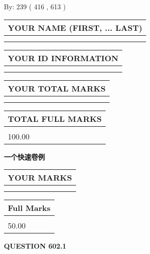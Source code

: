 \documentclass{ctexart}
\begin{document}
   
\hspace{1.0in} By: 
 239 ( 416 ,  613 )
   
   
   
   
\newpage 
\setcounter{page}{ 
   602001 } 
   
   
   
   
\noindent\begin{tabular}{|l|}
\hline
YOUR NAME (FIRST, ... LAST)  \\
\hline
 \\ 
 \\ 
\hline
\end{tabular}
\hspace{0.05in} \begin{tabular}{|l|}
\hline
 YOUR   ID   INFORMATION  \\
\hline
 \\ 
 \\ 
\hline
\end{tabular}
   
   
\vspace{0.2in}\noindent\begin{tabular}{|l|}
\hline
YOUR TOTAL MARKS  \\
\hline
 \\ 
 \\ 
\hline
\end{tabular}
\hspace{0.05in} \begin{tabular}{|l|}
\hline
TOTAL FULL MARKS  \\
\hline
 \\ 
100.00 \\
\hline
\end{tabular}
   
   
 \vspace{0.2in}
{\LARGE {\textbf{ 一个快速卷例}}}
   
   
  
\vspace{0.2in}
  
\noindent\begin{tabular}{|l|}
\hline
 YOUR MARKS  \\
\hline
 \\ 
 \\ 
\hline
\end{tabular}
\hspace{0.05in} \begin{tabular}{|l|}
\hline
 Full Marks  \\
\hline
 \\ 
50.00 \\
\hline
\end{tabular}
{\textbf{\Large{QUESTION
602.1 
}}}
  
\end{document}
